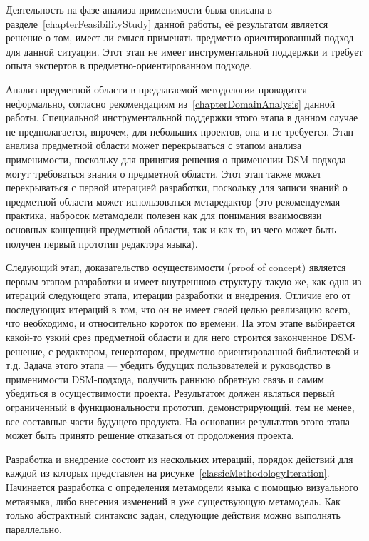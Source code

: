 Деятельность на фазе анализа применимости была описана в разделе~\ref{chapterFeasibilityStudy} 
данной работы, её результатом является решение о том, имеет ли смысл применять предметно-ориентированный 
подход для данной ситуации. Этот этап не имеет инструментальной поддержки и требует 
опыта экспертов в предметно-ориентированном подходе.

Анализ предметной области в предлагаемой методологии проводится неформально, согласно 
рекомендациям из~\ref{chapterDomainAnalysis} данной работы. Специальной инструментальной 
поддержки этого этапа в данном случае не предполагается, впрочем, для небольших проектов, 
она и не требуется. Этап анализа предметной области может перекрываться с этапом анализа 
применимости, поскольку для принятия решения о применении DSM-подхода могут требоваться 
знания о предметной области. Этот этап также может перекрываться с первой итерацией 
разработки, поскольку для записи знаний о предметной области может использоваться 
метаредактор (это рекомендуемая практика, набросок метамодели полезен как для понимания 
взаимосвязи основных концепций предметной области, так и как то, из чего может быть 
получен первый прототип редактора языка).

Следующий этап, доказательство осуществимости (proof of concept) является первым этапом 
разработки и имеет внутреннюю структуру такую же, как одна из итераций следующего этапа, 
итерации разработки и внедрения. Отличие его от последующих итераций в том, что он не 
имеет своей целью реализацию всего, что необходимо, и относительно короток по времени. 
На этом этапе выбирается какой-то узкий срез предметной области и для него строится 
законченное DSM-решение, с редактором, генератором, предметно-ориентированной библиотекой 
и т.д. Задача этого этапа --- убедить будущих пользователей и руководство в применимости 
DSM-подхода, получить раннюю обратную связь и самим убедиться в осуществимости проекта. 
Результатом должен являться первый ограниченный в функциональности прототип, демонстрирующий, 
тем не менее, все составные части будущего продукта. На основании результатов этого 
этапа может быть принято решение отказаться от продолжения проекта.

Разработка и внедрение состоит из нескольких итераций, порядок действий для каждой 
из которых представлен на рисунке~\ref{classicMethodologyIteration}. Начинается разработка 
с определения метамодели языка с помощью визуального метаязыка, либо внесения изменений 
в уже существующую метамодель. Как только абстрактный синтаксис задан, следующие действия 
можно выполнять параллельно.

